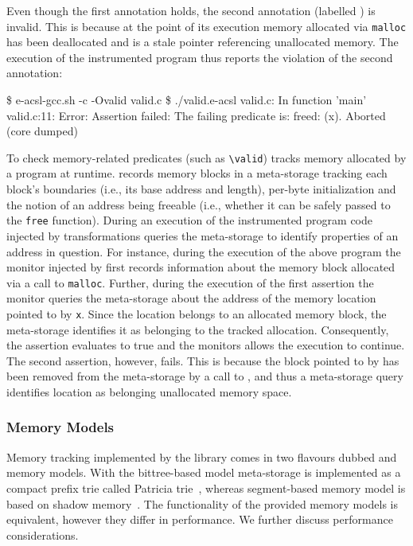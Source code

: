 
Even though the first annotation holds, the second annotation (labelled
) is invalid. This is because at the point of its execution memory
allocated via \texttt{malloc} has been deallocated and  is a stale pointer
referencing unallocated memory.  The execution of the instrumented program thus
reports the violation of the second annotation:

\begin{shell}
\$ e-acsl-gcc.sh -c -Ovalid valid.c
\$ ./valid.e-acsl
valid.c: In function 'main'
valid.c:11: Error: Assertion failed:
        The failing predicate is:
        freed: \valid(x).
Aborted (core dumped)
\end{shell}

To check memory-related predicates (such as \lstinline|\valid|) \eacsl tracks
memory allocated by a program at runtime. \eacsl records memory blocks in a
meta-storage tracking each block's boundaries (i.e., its base address and
length), per-byte initialization and the notion of an address being freeable
(i.e., whether it can be safely passed to the \texttt{free} function).  During
an execution of the instrumented program code injected by \eacsl
transformations queries the meta-storage to identify properties of an address
in question.  For instance, during the execution of the above program the
monitor injected by \eacsl first records information about the memory block
allocated via a call to \texttt{malloc}.  Further, during the execution of the
first assertion the monitor queries the meta-storage about the address of the
memory location pointed to by \texttt{x}.  Since the location belongs to an
allocated memory block, the meta-storage identifies it as belonging to the
tracked allocation.  Consequently, the assertion evaluates to true and the
monitors allows the execution to continue.  The second assertion, however,
fails. This is because the block pointed to by  has been removed from the
meta-storage by a call to , and thus a meta-storage query identifies
location  as belonging unallocated memory space.

\subsubsection{\eacsl Memory Models}

Memory tracking implemented by the \eacsl library comes in two flavours dubbed
 and  memory models. With the bittree-based
model meta-storage is implemented as a compact prefix trie called Patricia
trie~\cite{rv13}, whereas segment-based memory model is based on shadow
memory~\cite{vorobyov17ismm}. The functionality of the provided memory models is
equivalent, however they differ in performance. We further discuss performance
considerations.

